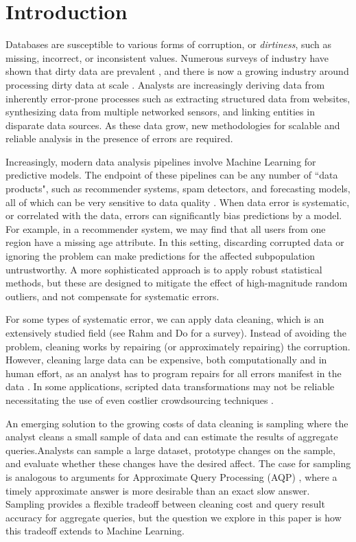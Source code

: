 \section{Introduction}
Databases are susceptible to various forms of corruption, or \emph{dirtiness}, such as missing, incorrect, or inconsistent values.
Numerous surveys of industry have shown that dirty data are prevalent \cite{Gartner}, and there is now a growing industry around processing dirty data at scale \cite{fortunearticle}.
Analysts are increasingly deriving data from inherently error-prone processes such as extracting structured data from websites, synthesizing data from multiple networked sensors, and linking entities in disparate data sources.
As these data grow, new methodologies for scalable and reliable analysis in the presence of errors are required. 

Increasingly, modern data analysis pipelines involve Machine Learning for predictive models.
The endpoint of these pipelines can be any number of ``data products", such as recommender systems, spam detectors, and forecasting models, all of which can be very sensitive to data quality \cite{xiaofeature}.
When data error is systematic, or correlated with the data, errors can significantly bias predictions by a model.
For example, in a recommender system, we may find that all users from one region have a missing age attribute.
In this setting, discarding corrupted data or ignoring the problem can make predictions for the affected subpopulation untrustworthy.
A more sophisticated approach is to apply robust statistical methods, but these are designed to mitigate the effect of high-magnitude random outliers, and not compensate for systematic errors.

For some types of systematic error, we can apply data cleaning, which is an extensively studied field (see Rahm and Do \cite{rahm2000data} for a survey).
Instead of avoiding the problem, cleaning works by repairing (or approximately repairing) the corruption.
However, cleaning large data can be expensive, both computationally and in human effort, as an analyst has to program repairs for all errors manifest in the data \cite{kandel2012}.
In some applications, scripted data transformations may not be reliable necessitating the use of even costlier crowdsourcing techniques \cite{gokhale2014corleone,park2014crowdfill}.

An emerging solution to the growing costs of data cleaning is sampling \cite{wang1999sample} where the analyst cleans a small sample of data and can estimate the results of aggregate queries.Analysts can sample a large dataset, prototype changes on the sample, and evaluate whether these changes have the desired affect.
The case for sampling is analogous to arguments for Approximate Query Processing (AQP) \cite{DBLP:conf/eurosys/AgarwalMPMMS13}, where a timely approximate answer is more desirable than an exact slow answer.
Sampling provides a flexible tradeoff between cleaning cost and query result accuracy for aggregate queries, but the question we explore in this paper is how this tradeoff extends to Machine Learning. 

